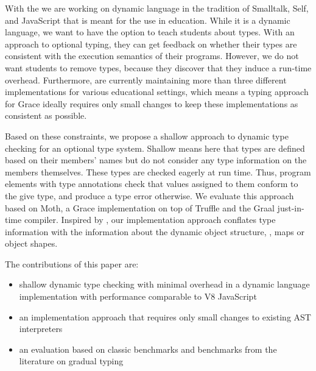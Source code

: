 
With the 
we are working on dynamic language in the tradition of
Smalltalk\citep{Smalltalk80}, Self\citep{Self}, and JavaScript
that is meant for the use in education.
While it is a dynamic language,
we want to have the option to teach students about types.
With an approach to optional typing,
they can get feedback on whether their types are consistent
with the execution semantics of their programs.
However, we do not want students to remove types,
because they discover that they induce a run-time overhead.
Furthermore, are currently maintaining more than three different implementations
for various educational settings,
which means a typing approach for Grace ideally requires only small changes
to keep these implementations as consistent as possible.

Based on these constraints,
we propose a shallow approach to dynamic type checking
for an optional type system.
Shallow means here that types are defined based on their members' names
but do not consider any type information on the members themselves.
These types are checked eagerly at run time.
Thus, program elements with type annotations check
that values assigned to them conform to the give type,
and produce a type error otherwise.
We evaluate this approach based on Moth,
a Grace implementation on top of Truffle
and the Graal just-in-time compiler\citep{Wurthinger2013,Wurthinger:2017:PPE}.
Inspired by \citet{Richards2017,Bauman2017},
our implementation approach conflates type information
with the information about the dynamic object structure,
\ie, maps\citep{Self} or object shapes\citep{woss2014object}.



The contributions of this paper are:

\begin{itemize}
\item shallow dynamic type checking with minimal overhead
      in a dynamic language implementation
      with performance comparable to V8 JavaScript
\item an implementation approach that requires
      only small changes to existing AST interpreters
\item an evaluation based on classic benchmarks
      and benchmarks from the literature on gradual typing
\end{itemize}
